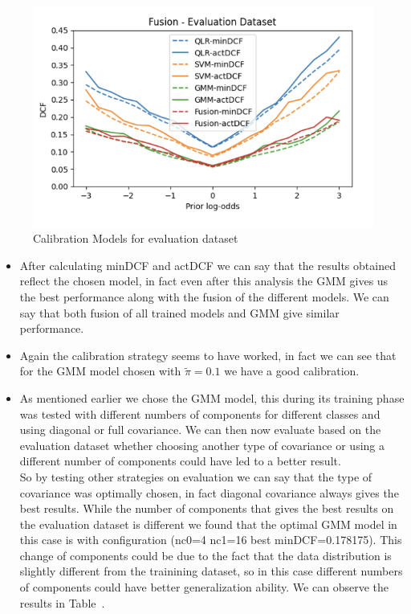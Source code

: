 \documentclass{article}
\begin{document}
\begin{figure}[H]
\begin{minipage}{.4\textwidth}
    \end{minipage}
    \begin{minipage}{.4\textwidth}
        \centering
        \includegraphics[width=\linewidth]{./img/EVAL4.png}
    \end{minipage}
    \caption{Calibration Models for evaluation dataset} %
    \label{fig:CalEVAL} %
\end{figure}
\begin{itemize}
    \item After calculating minDCF and actDCF we can say that the results obtained reflect the chosen model, in fact even after this analysis the GMM gives us the best performance along with the fusion of the different models. We can say that both fusion of all trained models and GMM give similar performance.
    \item Again the calibration strategy seems to have worked, in fact we can see that for the GMM model chosen with \(\tilde{\pi}=0.1\) we have a good calibration.
    \item As mentioned earlier we chose the GMM model, this during its training phase was tested with different numbers of components for different classes and using diagonal or full covariance. We can then now evaluate based on the evaluation dataset whether choosing another type of covariance or using a different number of components could have led to a better result. \\
    So by testing other strategies on evaluation we can say that the type of covariance was optimally chosen, in fact diagonal covariance always gives the best results. While the number of components that gives the best results on the evaluation dataset is different we found that the optimal GMM model in this case is with configuration (nc0=4 nc1=16 best minDCF=0.178175). This change of components could be due to the fact that the data distribution is slightly different from the trainining dataset, so in this case different numbers of components could have better generalization ability.
    We can observe the results in Table~.
\end{itemize}
\end{document}
